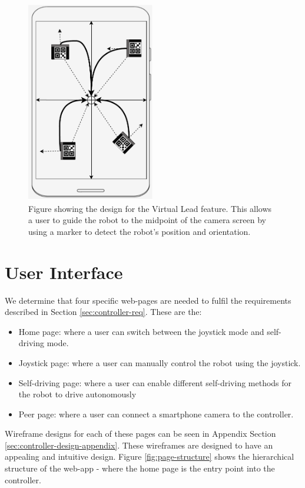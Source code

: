 \documentclass{l4proj}
\begin{document}
\begin{figure}[!ht]
    \centering
    \includegraphics[width=0.50\textwidth]{images/virtual-lead-design.pdf}
    \caption{Figure showing the design for the Virtual Lead feature. This allows a user to guide the robot to the midpoint of the camera screen by using a marker to detect the robot's position and orientation.}
    \label{fig:virtual-lead-design}
\end{figure}


\section{User Interface}
We determine that four specific web-pages are needed to fulfil the requirements described in Section \ref{sec:controller-req}. These are the:
\begin{itemize}
    \item Home page: where a user can switch between the joystick mode and self-driving mode.
    \item Joystick page: where a user can manually control the robot using the joystick.
    \item Self-driving page: where a user can enable different self-driving methods for the robot to drive autonomously
    \item Peer page: where a user can connect a smartphone camera to the controller.
\end{itemize}

Wireframe designs for each of these pages can be seen in Appendix Section \ref{sec:controller-design-appendix}. These wireframes are designed to have an appealing and intuitive design. Figure \ref{fig:page-structure} shows the hierarchical structure of the web-app - where the home page is the entry point into the controller.
\end{document}
